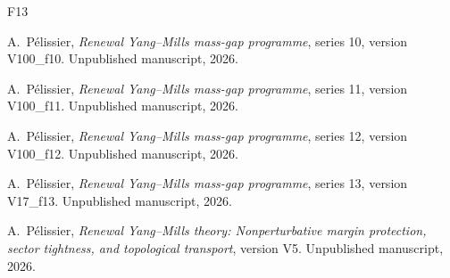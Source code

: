 \documentclass[11pt,oneside,openany]{book}
\theoremstyle{definition}
\theoremstyle{remark}
\begin{document}
\begin{thebibliography}{F13}

A.~P\'elissier, \emph{Renewal Yang--Mills mass-gap programme}, series 10, version V100\_f10. Unpublished manuscript, 2026.


A.~P\'elissier, \emph{Renewal Yang--Mills mass-gap programme}, series 11, version V100\_f11. Unpublished manuscript, 2026.

A.~P\'elissier, \emph{Renewal Yang--Mills mass-gap programme}, series 12,
version V100\_f12. Unpublished manuscript, 2026.

A.~P\'elissier, \emph{Renewal Yang--Mills mass-gap programme}, series 13,
version V17\_f13. Unpublished manuscript, 2026.


A.~P\'elissier, \emph{Renewal Yang--Mills theory: Nonperturbative margin protection, sector tightness, and topological transport}, version V5. Unpublished manuscript, 2026.

\end{thebibliography}
\end{document}
